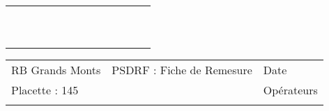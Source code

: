 \documentclass[a4paper, landscape]{article}\usepackage[]{graphicx}\usepackage[]{color}
\begin{document}
{\begin{tabular}{|p{1cm}|p{2cm}|p{1.6cm}|p{1.6cm}|p{1.6cm}|p{1.6cm}|p{1.5cm}|p{1.5cm}|p{1.5cm}|p{1.5cm}|p{1.5cm}|p{7.5cm}|p{5cm}|}
   \hline
 &  &  &  &  &  &  &  &  &  &  &  &  \\ 
   \rowcolor[gray]{0.95} \hline
 &  &  &  &  &  &  &  &  &  &  &  &  \\ 
   \hline
 &  &  &  &  &  &  &  &  &  &  &  &  \\ 
   \rowcolor[gray]{0.95} \hline
 &  &  &  &  &  &  &  &  &  &  &  &  \\ 
   \hline
 &  &  &  &  &  &  &  &  &  &  &  &  \\ 
   \rowcolor[gray]{0.95} \hline
 &  &  &  &  &  &  &  &  &  &  &  &  \\ 
   \hline
 &  &  &  &  &  &  &  &  &  &  &  &  \\ 
   \rowcolor[gray]{0.95} \hline
 &  &  &  &  &  &  &  &  &  &  &  &  \\ 
   \hline
 &  &  &  &  &  &  &  &  &  &  &  &  \\ 
   \rowcolor[gray]{0.95} \hline
 &  &  &  &  &  &  &  &  &  &  &  &  \\ 
   \hline
\end{tabular}
}

\begin{tabular}{p{10cm}p{10cm}p{8cm}}
  RB Grands Monts & PSDRF : Fiche de Remesure & Date \\ 
  Placette : 145 &  & Opérateurs \\ 
   &  &  \\ 
  \end{tabular}
\end{document}
